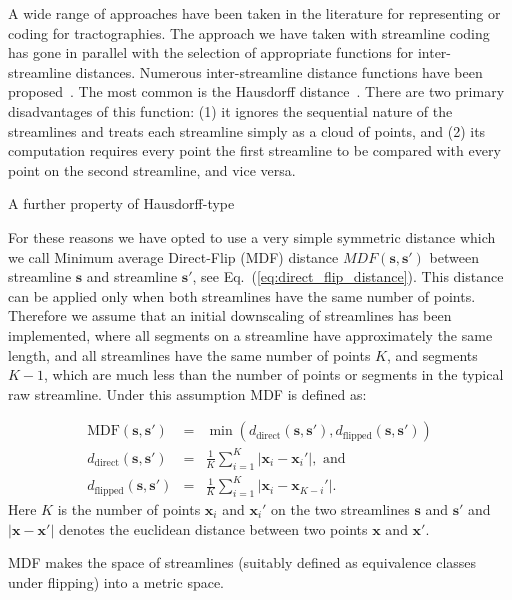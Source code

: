 \documentclass{bioinfo}
\begin{document}
\begin{methods}
A wide range of approaches have been taken in the literature for
representing or coding for tractographies. The approach we have taken
with streamline coding has gone in parallel with the selection of
appropriate functions for inter-streamline distances.  Numerous
inter-streamline distance functions have been proposed~\citep{Ding2003,
  MaddahIPMI2007, zhang2005dti}. The most common is the Hausdorff
distance~\citep[and many other studies]{corouge2004towards}. There are
two primary disadvantages of this function: (1) it ignores the sequential
nature of the streamlines and treats each streamline simply as a cloud
of points, and (2) its computation requires every point  the first
streamline to be compared with every point on the second streamline, and
vice versa. 

A further property of Hausdorff-type  

For these reasons we have opted to use a very simple
symmetric distance \citep{EGMB10, Visser2010} which we call Minimum
average Direct-Flip (MDF) distance $MDF(\mathbf{s},\mathbf{s'})$ between
streamline $\mathbf{s}$ and streamline $\mathbf{s'}$, see
Eq.~(\ref{eq:direct_flip_distance}). This distance can be applied only
when both streamlines have the same number of points. Therefore we
assume that an initial downscaling of streamlines has been implemented,
where all segments on a streamline have approximately the same length,
and all streamlines have the same number of points $K$, and segments
$K-1$, which are much less than the number of points or segments in the
typical raw streamline.  Under this assumption MDF is defined as:

\begin{eqnarray}
\textrm{MDF}(\mathbf{s},\mathbf{s'}) & = & \min(d_{\textrm{direct}}(\mathbf{s},\mathbf{s'}),d_{\textrm{flipped}}(\mathbf{s},\mathbf{s'}))\label{eq:direct_flip_distance}\\
d_{\textrm{direct}}(\mathbf{s},\mathbf{s'}) & = & \frac{1}{K}\sum_{i=1}^{K}|\mathbf{x}_{i}-\mathbf{x}_{i}'|,\,\,\textrm{and}\nonumber\\
d_{\textrm{flipped}}(\mathbf{s},\mathbf{s'}) & = & \frac{1}{K}\sum_{i=1}^{K}|\mathbf{x}_{i}-\mathbf{x}_{K-i}'|.\nonumber
\end{eqnarray}
\noindent
Here $K$ is the number of points $\mathbf{x}_{i}$ and $\mathbf{x}_{i}'$ on the two streamlines $\mathbf{s}$ and $\mathbf{s'}$
and $|\mathbf{x}-\mathbf{x'}|$ denotes the euclidean distance between two points $\mathbf{x}$ and
$\mathbf{x'}$.

MDF makes the space of streamlines (suitably defined as equivalence
classes under flipping) into a metric space.


\end{methods}
\end{document}
